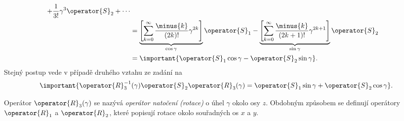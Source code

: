 \begin{solution}
\begin{align}
				+\frac{1}{3!}\gamma^{3}\operator{S}_{2}+\dotsb\nonumber\\
			&=\underbrace{\left[\sum_{k=0}^{\infty}\frac{\minus{k}}{(2k)!}\gamma^{2k}\right]}
				_{\cos{\gamma}}\operator{S}_{1}
				-\underbrace{\left[\sum_{k=0}^{\infty}\frac{\minus{k}}{(2k+1)!}\gamma^{2k+1}\right]}
				_{\sin{\gamma}}\operator{S}_{2}\nonumber\\
			&=\important{\operator{S}_{1}\cos{\gamma}-\operator{S}_{2}\sin{\gamma}}.
	\end{align}
	Stejný postup vede v případě druhého vztahu ze zadání na
	\begin{equation}
		\important{\operator{R}^{-1}_{3}(\gamma)\operator{S}_{2}\operator{R}_{3}(\gamma)
			=\operator{S}_{1}\sin{\gamma}+\operator{S}_{2}\cos{\gamma}}.
	\end{equation}
\end{solution}

\begin{note}
	Operátor $\operator{R}_{3}(\gamma)$ se nazývá \emph{operátor natočení (rotace)} o úhel $\gamma$ okolo osy $z$.
	Obdobným způsobem se definují operátory $\operator{R}_{1}$ a $\operator{R}_{2}$, které popisují rotace okolo souřadných os $x$ a $y$.
\end{note}